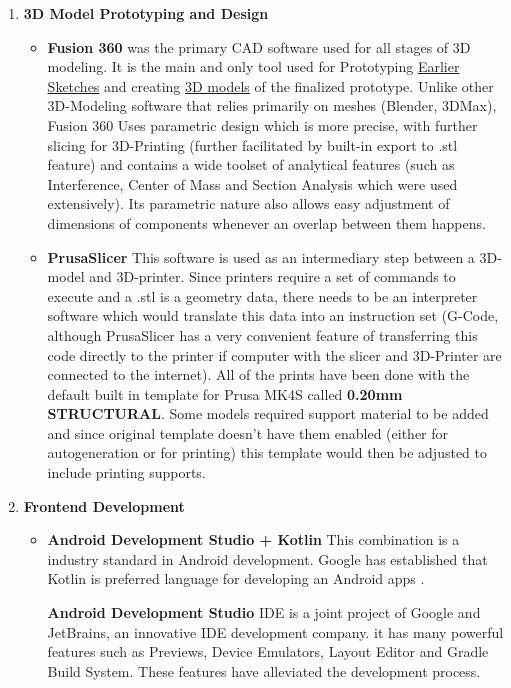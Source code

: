\begin{enumerate}
\begin{itemize}
	\end{itemize}
	\item\textbf{3D Model Prototyping and Design}
	\begin{itemize}
		\item\textbf{Fusion 360} was the primary \ac{CAD} software used for all stages of 3D modeling. It is the main and only tool used for Prototyping  \hyperref[sec:Bodydesign]{Earlier Sketches} and creating \hyperref[sec:3DPrint]{3D models} of the finalized prototype. Unlike other 3D-Modeling software that relies primarily on meshes (Blender, 3DMax), Fusion 360 Uses parametric design which is more precise, with further slicing for 3D-Printing (further facilitated by built-in export to .stl feature) and contains a wide toolset of analytical features (such as Interference, Center of Mass and Section Analysis which were used extensively). Its parametric nature also allows easy adjustment of dimensions of components whenever an overlap between them happens.
		
		\item\textbf{PrusaSlicer} This software is used as an intermediary step between a 3D-model and 3D-printer. Since printers require a set of commands to execute and a .stl is a geometry data, there needs to be an interpreter software which would translate this data into an instruction set (G-Code, although PrusaSlicer has a very convenient feature of transferring this code directly to the printer if computer with the slicer and 3D-Printer are connected to the internet). All of the prints have been done with the default built in template for Prusa MK4S called \textbf{0.20mm STRUCTURAL}. Some models required support material to be added and since original template doesn't have them enabled (either for autogeneration or for printing) this template would then be adjusted to include printing supports.
	\end{itemize}
	\item\textbf{Frontend Development}
	\begin{itemize}
		
		\item \textbf{Android Development Studio + Kotlin} This combination is a industry standard in Android development. Google has established that Kotlin is preferred language for developing an Android apps \cite{googleIO2019Kotlin}. 
		
		\textbf{Android Development Studio} \ac{IDE} is a joint project of Google and JetBrains, an innovative \ac{IDE} development company. it has many powerful features such as Previews, Device Emulators, Layout Editor and Gradle Build System. These features have alleviated the development process.
		

\end{itemize}
\end{enumerate}
